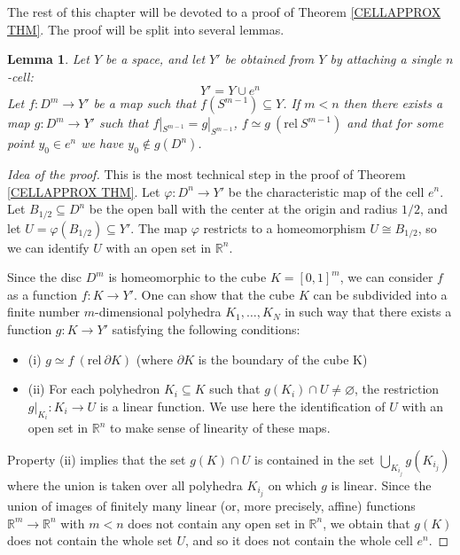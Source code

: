 \documentclass[11pt, letterpaper, oneside]{report}
\theoremstyle{pplain}
\newtheorem{lemma}[theorem]{Lemma}
\theoremstyle{ddefinition}
\theoremstyle{nnn}
\theoremstyle{eexercise}
\newcommand{\R}{{\mathbb R}}
\newcommand{\bit}{\begin{itemize}}
\newcommand{\eit}{\end{itemize}}
\newcommand{\rel}{\mathrm{rel\ }}
\begin{document}
The rest of this chapter will be devoted to a proof of Theorem \ref{CELLAPPROX THM}. 
The proof will be split into several lemmas. 


\begin{lemma}
\label{NOT ONTO CELL DISC LEMMA}
Let $Y$ be a space, and let $Y'$ be obtained from $Y$ by attaching a single $n$-cell:
$$Y' = Y\cup e^{n}$$
Let $f\colon D^{m} \to Y'$ be a map such that $f(S^{m-1}) \subseteq Y$. If $m< n$ then 
there exists a map $g\colon D^{m}\to Y'$ such that $f|_{S^{m-1}} = g|_{S^{m-1}}$,  
$f\simeq g \ (\rel S^{m-1})$ and that for some point $y_{0}\in e^{n}$ we have 
$y_{0}\not\in g(D^{n})$. 
\end{lemma}

\begin{proof}[Idea of the proof]
This is the most technical step in the proof of Theorem \ref{CELLAPPROX THM}. 
Let $\varphi \colon D^{n} \to Y'$ be the characteristic map of the cell $e^{n}$. 
Let $B_{1/2}\subseteq D^{n}$ be the open ball with the center at the origin and 
radius $1/2$, and let $U = \varphi(B_{1/2})\subseteq Y'$.  The map $\varphi$
restricts to a homeomorphism $U\cong B_{1/2}$, so we can identify $U$ with 
an open set in $\R^{n}$. 


Since the disc $D^{m}$ is homeomorphic to the cube $K = [0, 1]^{m}$, we can consider $f$
as a function $f\colon K \to Y'$. One can show that the cube $K$  can be subdivided 
into a finite number $m$-dimensional polyhedra  $K_{1}, \dots, K_{N}$ in such way that there 
exists a function $g\colon K \to Y'$ satisfying the following conditions:
\bit
\item[(i)] $g\simeq f \ (\rel \partial K)$ (where $\partial K$ is the boundary of the cube K)
\item[(ii)] For each polyhedron $K_{i}\subseteq K$ such that $g(K_{i})\cap U \neq \varnothing$,
the restriction $g|_{K_{i}}\colon K_{i}\to U$ is a linear function. We use here the 
identification of $U$ with an open set in $\R^{n}$ to make sense of linearity of these maps. 
\eit
Property (ii) implies that  the set $g(K)\cap U$ is contained in the set $\bigcup_{K_{i_{j}}} g(K_{i_{j}})$
where the union is taken over all polyhedra $K_{i_{j}}$ on which $g$ is linear. Since the union of images of 
finitely many linear (or, more precisely, affine) functions $\R^{m}\to \R^{n}$ with $m< n$ does not 
contain any open set in $\R^{n}$, we obtain that $g(K)$ does not contain  the whole set $U$, and
so it does not contain the whole cell $e^{n}$. 


\end{proof}
\end{document}
